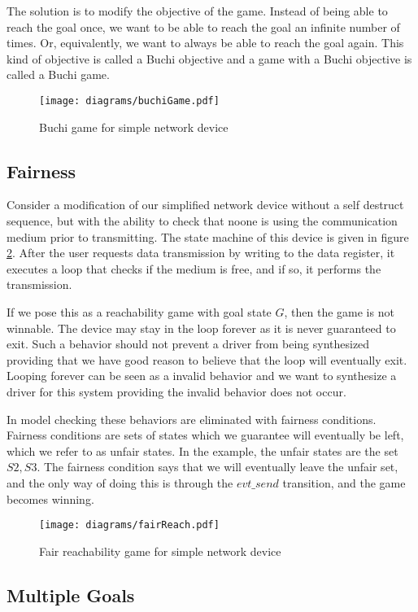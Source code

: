 The solution is to modify the objective of the game. Instead of being able to reach the goal once, we want to be able to reach the goal an infinite number of times. Or, equivalently, we want to always be able to reach the goal again. This kind of objective is called a Buchi objective and a game with a Buchi objective is called a Buchi game. 

\begin{figure}[t]
\centering
\texttt{[image: diagrams/buchiGame.pdf]}
\caption{Buchi game for simple network device}
\label{fig:buchi}
\end{figure}

\subsection{Fairness}

Consider a modification of our simplified network device without a self destruct sequence, but with the ability to check that noone is using the communication medium prior to transmitting. The state machine of this device is given in figure \ref{fig:fair}. After the user requests data transmission by writing to the data register, it executes a loop that checks if the medium is free, and if so, it performs the transmission. 

If we pose this as a reachability game with goal state $G$, then the game is not winnable. The device may stay in the loop forever as it is never guaranteed to exit. Such a behavior should not prevent a driver from being synthesized providing that we have good reason to believe that the loop will eventually exit. Looping forever can be seen as a invalid behavior and we want to synthesize a driver for this system providing the invalid behavior does not occur. 

In model checking these behaviors are eliminated with fairness conditions. Fairness conditions are sets of states which we guarantee will eventually be left, which we refer to as unfair states. In the example, the unfair states are the set ${S2, S3}$. The fairness condition says that we will eventually leave the unfair set, and the only way of doing this is through the $evt\_send$ transition, and the game becomes winning.

\begin{figure}[t]
\centering
\texttt{[image: diagrams/fairReach.pdf]}
\caption{Fair reachability game for simple network device}
\label{fig:fair}
\end{figure}

\subsection{Multiple Goals}

